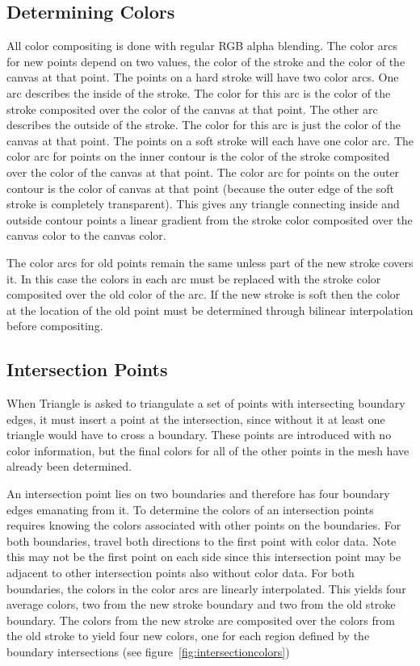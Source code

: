 \documentclass[review]{acmsiggraph}
\begin{document}
\subsection{Determining Colors}
All color compositing is done with regular RGB alpha blending.  The color arcs for new points depend on two values, the color of the stroke and the color
of the canvas at that point. The points on a hard stroke will have two color arcs. One
arc describes the inside of the stroke. The color for this arc is the color of the stroke
composited over the color of the canvas at that point. The other arc describes the outside
of the stroke. The color for this arc is just the color of the canvas at that point. The
points on a soft stroke will each have one color arc. The color arc for points on the inner
contour is the color of the stroke composited over the color of the canvas at that point.
The color arc for points on the outer contour is the color of canvas at that point (because the outer edge of the soft stroke is completely transparent).
This gives any triangle connecting inside and outside contour points a linear gradient
from the stroke color composited over the canvas color to the canvas color.

The color arcs for old points remain the same unless part of the new stroke covers it.
In this case the colors in each arc must be replaced with the stroke color composited over
the old color of the arc. If the new stroke is soft then the color at the location of
the old point must be determined through bilinear interpolation before compositing.




\subsection{Intersection Points}

When Triangle is asked to triangulate a set of points with intersecting boundary edges, it must
insert a point at the intersection, since without it at least one triangle would have to
cross a boundary. These points are introduced with no color information, but the final colors for 
all of the other points in the mesh have already been determined.

An intersection point lies on two boundaries and therefore has four boundary edges emanating from it. 
To determine the colors of an intersection points requires knowing the colors associated with
other points on the boundaries. For both boundaries, travel both directions to the first point with color data. Note this may not
be the first point on each side since this intersection point may be adjacent to other intersection
points also without color data. For both boundaries, the colors in the color arcs are linearly interpolated. 
This yields four average colors, two from the new stroke boundary and two from the old stroke boundary.
The colors from the new stroke are composited over the colors from the old stroke to yield four new
colors, one for each region defined by the boundary intersections (see figure~\ref{fig:intersectioncolors}) 
\end{document}
